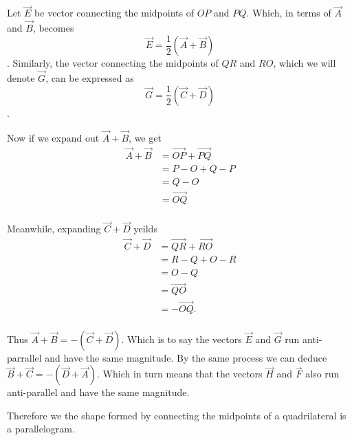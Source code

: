 \documentclass[main.tex]{subfiles}
\begin{document}
Let $\vec{E}$ be vector connecting the midpoints of $OP$ and $PQ$.
Which, in terms of $\vec{A}$ and $\vec{B}$, becomes
\[\vec{E} = \frac{1}{2}(\vec{A} + \vec{B})\].
Similarly, the vector connecting the midpoints of $QR$ and $RO$, which
we will denote $\vec{G}$, can be expressed as
\[\vec{G} = \frac{1}{2}(\vec{C} + \vec{D})\].

Now if we expand out $\vec{A} + \vec{B}$, we get
\begin{align*}
\vec{A} + \vec{B} &= \vec{OP} + \vec{PQ}\\
                  &= P - O + Q - P\\
                  &=  Q - O \\
                  &=  \vec{OQ} \\
\end{align*}

Meanwhile, expanding $\vec{C} + \vec{D}$ yeilds
\begin{align*}
\vec{C} + \vec{D} &= \vec{QR} + \vec{RO}\\
                  &= R - Q + O - R\\
                  &=  O - Q \\
                  &=  \vec{QO} \\
                  &=  -\vec{OQ}. \\
\end{align*}

Thus $\vec{A} + \vec{B} = -(\vec{C} + \vec{D})$.
Which is to say the vectors $\vec{E}$ and $\vec{G}$ run anti-parrallel
and have the same magnitude. By the same process we can deduce
$\vec{B}+\vec{C} = -(\vec{D}+\vec{A})$.
Which in turn means that the vectors $\vec{H}$ and $\vec{F}$ also run
anti-parallel  and have the same magnitude.

Therefore we the shape formed by connecting the midpoints of a
quadrilateral is a parallelogram.
\end{document}
